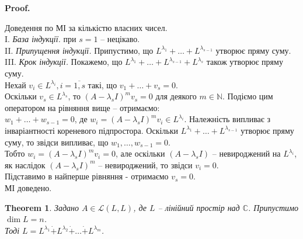 \documentclass[a4paper, 10pt]{article}
\makeatletter
\theoremstyle{theoremdd}
\newtheorem{theorem}{Theorem}[subsection]
\renewenvironment{proof}[1][Proof.\\]{\par
\pushQED{\hfill \qed}%
\normalfont \topsep6\p@\@plus6\p@\relax
\trivlist
\item\relax
{\bfseries
#1\@addpunct{.}}\hspace\labelsep\ignorespaces
}{%
\popQED\endtrivlist\@endpefalse
}
\makeatother
\begin{document}
\begin{proof}
Доведення по МІ за кількістю власних чисел.\\
I. \textit{База індукції.} при $s = 1$ -- нецікаво.\\
II. \textit{Припущення індукції.} Припустимо, що $L^{\lambda_1}+\dots +L^{\lambda_{s-1}}$ утворює пряму суму. \\
III. \textit{Крок індукції.} Покажемо, що $L^{\lambda_1}+\dots + L^{\lambda_{s-1}} + L^{\lambda_s}$ також утворює пряму суму. \\ Нехай $v_i \in L^{\lambda_i}, i = \overline{1,s}$ такі, що $v_1+\dots+v_s = 0$.\\
Оскільки $v_s \in L^{\lambda_s}$, то $(A-\lambda_s I)^m v_s = 0$ для деякого $m \in \mathbb{N}$. Подіємо цим оператором на рівняння вище -- отримаємо:\\
$w_1 + \dots + w_{s-1} = 0$, де $w_i = (A-\lambda_s I)^m v_i \in L^{\lambda_i}$. Належність випливає з інваріантності кореневого підпростора. Оскільки $L^{\lambda_1}+\dots +L^{\lambda_{s-1}}$ утворює пряму суму, то звідси випливає, що $w_1,\dots,w_{s-1} = 0$.\\
Тобто $w_i = (A-\lambda_s I)^m v_i = 0$, але оскільки $(A-\lambda_s I)$ -- невироджений на $L^{\lambda_i}$, як наслідок  $(A-\lambda_s I)^m$ -- невироджений, то звідси $v_i = 0$.\\
Підставимо в найперше рівняння - отримаємо $v_s = 0$.\\
МІ доведено.
\end{proof}

\begin{theorem}
\label{space_decomposition_into_generalized_eigenspace}
Задано $A \in \mathcal{L}(L,L)$, де $L$ -- лінійний простір над $\mathbb{C}$. Припустимо $\dim L = n$.\\
Тоді $L = L^{\lambda_1} \dot{+} L^{\lambda_2} \dot{+} \dots \dot{+} L^{\lambda_m}$.
\end{theorem}
\end{document}
